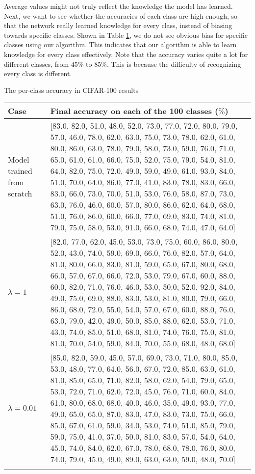 Average values might not truly reflect the knowledge the model has learned. Next, we want to see whether the accuracies of each class are high enough, so that the network really learned knowledge for every class, instead of biasing towards specific classes. Shown in Table \ref{tab:cifar100}, we do not see obvious bias for specific classes using our algorithm. This indicates that our algorithm is able to learn knowledge for every class effectively. Note that the accuracy varies quite a lot for different classes, from $45\%$ to $85\%$. This is because the difficulty of recognizing every class is different.
\begin{table}[!hpb]
	\centering
	{The per-class accuracy in CIFAR-100 results}
	\label{tab:firstone}
	\begin{tabular}{@{}lp{10cm}@{}} \toprule
		Case &  Final accuracy on each of the 100 classes ($\%$)\\ \midrule
		Model trained from scratch  &[83.0, 82.0, 51.0, 48.0, 52.0, 73.0, 77.0, 72.0, 80.0, 79.0, 57.0, 46.0, 78.0, 62.0, 63.0, 75.0, 73.0, 78.0, 62.0, 61.0, 80.0, 86.0, 63.0, 78.0, 79.0, 58.0, 73.0, 59.0, 76.0, 71.0, 65.0, 61.0, 61.0, 66.0,
		75.0, 52.0, 75.0, 79.0, 54.0, 81.0, 64.0, 82.0, 75.0, 72.0, 49.0, 59.0, 49.0, 61.0, 93.0, 84.0, 51.0, 70.0, 64.0, 86.0, 77.0, 41.0, 83.0, 78.0, 83.0, 66.0, 83.0, 66.0, 73.0, 70.0, 51.0, 53.0, 76.0, 58.0,
		87.0, 73.0, 63.0, 76.0, 46.0, 60.0, 57.0, 80.0, 86.0, 62.0, 64.0, 68.0, 51.0, 76.0, 86.0, 60.0, 66.0, 77.0, 69.0, 83.0, 74.0, 81.0, 79.0, 75.0, 58.0, 53.0, 91.0, 66.0, 68.0, 74.0, 47.0, 64.0]\\
		$\lambda=1$  &[82.0, 77.0, 62.0, 45.0, 53.0, 73.0, 75.0, 60.0, 86.0, 80.0, 52.0, 43.0, 74.0, 59.0, 69.0, 66.0, 76.0, 82.0, 57.0, 64.0, 81.0, 80.0, 66.0, 83.0, 81.0, 59.0, 65.0, 67.0, 80.0, 68.0, 66.0, 57.0, 67.0, 66.0, 72.0, 53.0, 79.0, 67.0, 60.0, 88.0, 60.0, 82.0, 71.0, 76.0, 46.0, 53.0, 50.0, 52.0, 92.0, 84.0, 49.0, 75.0, 69.0, 88.0, 83.0, 53.0, 81.0, 80.0, 79.0, 66.0, 86.0, 68.0, 72.0, 55.0, 54.0, 57.0, 67.0, 60.0, 88.0, 76.0, 63.0, 79.0, 42.0, 49.0, 50.0, 85.0, 88.0, 62.0, 53.0, 71.0, 43.0, 74.0, 85.0, 51.0, 68.0, 81.0, 74.0, 76.0, 75.0, 81.0, 81.0, 70.0, 54.0, 59.0, 84.0, 70.0, 55.0, 68.0, 48.0, 68.0]
		\\
		$\lambda=0.01$  & [85.0, 82.0, 59.0, 45.0, 57.0, 69.0, 73.0, 71.0, 80.0, 85.0, 53.0, 48.0, 77.0, 64.0, 56.0, 67.0, 72.0, 85.0, 63.0, 61.0, 81.0, 85.0, 65.0, 71.0, 82.0, 58.0, 62.0, 54.0, 79.0, 65.0, 53.0, 72.0, 71.0, 62.0, 72.0, 45.0, 76.0, 71.0, 60.0, 84.0, 61.0, 80.0, 68.0, 68.0, 40.0, 46.0, 35.0, 49.0, 93.0, 77.0, 49.0, 65.0, 65.0, 87.0, 83.0, 47.0, 83.0, 73.0, 75.0, 66.0, 85.0, 67.0, 61.0, 59.0, 34.0, 53.0, 74.0, 51.0, 85.0, 79.0, 59.0, 75.0, 41.0, 37.0, 50.0, 81.0, 83.0, 57.0, 54.0, 64.0, 45.0, 74.0, 84.0, 62.0, 67.0, 78.0, 68.0, 78.0, 76.0, 80.0, 74.0, 79.0, 45.0, 49.0, 89.0, 63.0, 63.0, 59.0, 48.0, 70.0]\\ \bottomrule
\label{tab:cifar100}
	\end{tabular}
\end{table}

